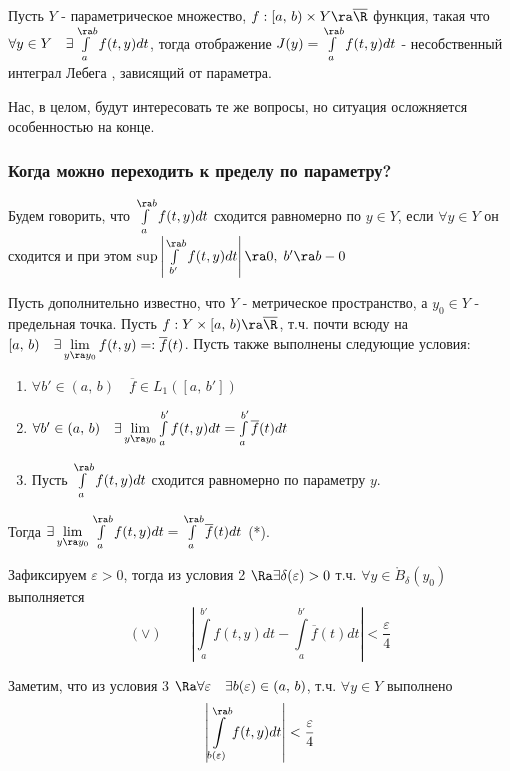  Пусть $Y$ - параметрическое множество, $f : [a, \, b) \times Y \ra \overline{\R}$ функция, такая что $\forall y \in Y \quad \exists \int\limits^{\ra b}_a f(t, y) d t$, тогда отображение $J(y) = \int\limits_a^{\ra b} f(t, y) d t$ - несобственный интеграл Лебега , зависящий от параметра.

Нас, в целом, будут интересовать те же вопросы, но ситуация осложняется особенностью на конце.

\subsubsection{Когда можно переходить к пределу по параметру?}

 Будем говорить, что $\int\limits^{\ra b}_{a} f(t, y) dt$ сходится равномерно по $y \in Y$, если $\forall y \in Y$ он сходится и при этом $\sup \left| \int\limits^{\ra b}_{b'} f(t, y) dt \right| \ra 0, \; b' \ra b - 0$

\theorem Пусть дополнительно известно, что $Y$ - метрическое пространство, а $y_0 \in Y$ - предельная точка. Пусть $f : Y \times [a, \, b) \ra \overline{\R}$, т.ч. почти всюду на $[a, \, b) \quad \exists \lim\limits_{y \ra y_0}f(t, y) =: \overline{f}(t)$. Пусть также выполнены следующие условия:
\begin{enumerate}
    \item $\forall b' \in (a, \, b) \quad \overline{f} \in L_1([a, \, b'])$
    \item $\forall b' \in (a, \, b) \quad \exists\lim\limits_{y \ra y_0} \int\limits^{b'}_a f(t, y) dt = \int\limits^{b'}_a \overline{f}(t) dt$
    \item Пусть $\int\limits_a^{\ra b} f(t, y) dt$ сходится равномерно по параметру $y$. 
\end{enumerate}


Тогда $\exists \lim\limits_{y \ra y_0} \int \limits^{\ra b}_a f(t, y) dt = \int\limits^{\ra b}_{a} \overline{f}(t)dt$ (*).

\proof Зафиксируем $\varepsilon > 0$, тогда из условия 2 $\Ra \exists\delta(\varepsilon) > 0$  т.ч. $\forall y \in \mathring{B}_\delta (y_0)$ выполняется
$$(\vee) \qquad \left| \int\limits_a^{b'}f(t, y) dt - \int\limits_a^{b'}\overline{f}(t) dt \right| < \frac{\varepsilon}{4}$$

Заметим, что из условия 3 $\Ra \forall \varepsilon \quad \exists b(\varepsilon) \in (a, \, b)$, т.ч. $\forall y \in Y$ выполнено
$$\left| \int\limits_{b(\varepsilon)}^{\ra b} f(t, y) dt \right| < \frac{\varepsilon}{4}$$

